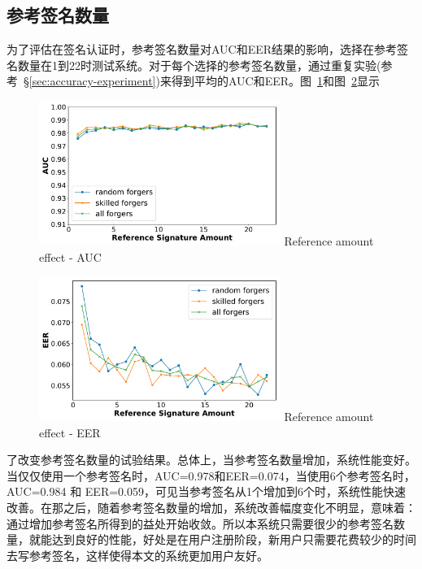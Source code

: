 \subsection{参考签名数量}
为了评估在签名认证时，参考签名数量对AUC和EER结果的影响，选择在参考签名数量在1到22时测试系统。对于每个选择的参考签名数量，通过重复实验(参考~\S\ref{sec:accuracy-experiment})来得到平均的AUC和EER。图~\ref{fig:rcount-auc-lines}和图~\ref{fig:rcount-eer-lines}显示
\begin{figure}
  \centering
  \includegraphics[width=0.7\textwidth]{figure/rcount-auc-lines.pdf}
      {Reference amount effect - AUC}
  \label{fig:rcount-auc-lines}
\end{figure}
\begin{figure}
  \centering
  \includegraphics[width=0.7\textwidth]{figure/rcount-eer-lines.pdf}
      {Reference amount effect - EER}
  \label{fig:rcount-eer-lines}
\end{figure}
了改变参考签名数量的试验结果。总体上，当参考签名数量增加，系统性能变好。当仅仅使用一个参考签名时，AUC=0.978和EER=0.074，当使用6个参考签名时，AUC=0.984 和 EER=0.059，可见当参考签名从1个增加到6个时，系统性能快速改善。在那之后，随着参考签名数量的增加，系统改善幅度变化不明显，意味着：通过增加参考签名所得到的益处开始收敛。所以本系统只需要很少的参考签名数量，就能达到良好的性能，好处是在用户注册阶段，新用户只需要花费较少的时间去写参考签名，这样使得本文的系统更加用户友好。


